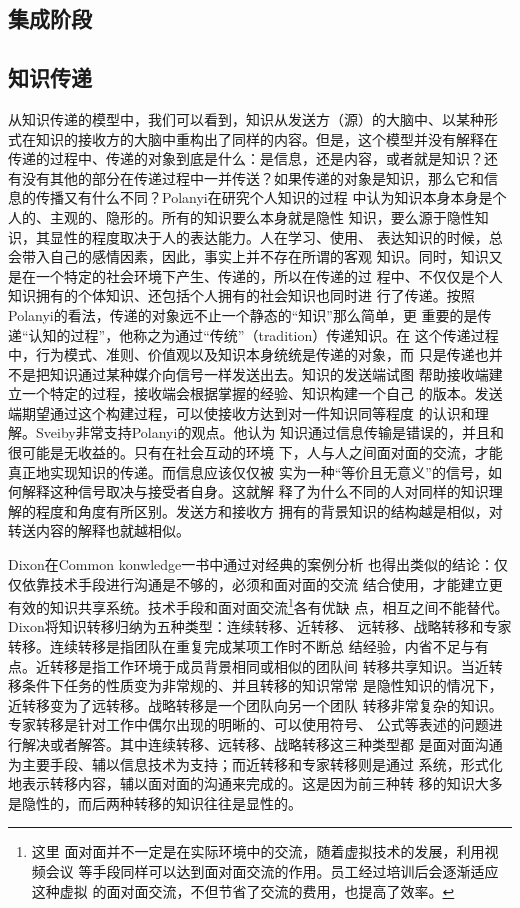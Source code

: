 \documentclass[12pt,a4paper]{ctexart}
\begin{document}
\subsection{集成阶段}




\subsection{知识传递}
从知识传递的模型中，我们可以看到，知识从发送方（源）的大脑中、以某种形
式在知识的接收方的大脑中重构出了同样的内容。但是，这个模型并没有解释在
传递的过程中、传递的对象到底是什么：是信息，还是内容，或者就是知识？还
有没有其他的部分在传递过程中一并传送？如果传递的对象是知识，那么它和信
息的传播又有什么不同？Polanyi\cite{polanyi1998pkt}在研究个人知识的过程
中认为知识本身本身是个人的、主观的、隐形的。所有的知识要么本身就是隐性
知识，要么源于隐性知识，其显性的程度取决于人的表达能力。人在学习、使用、
表达知识的时候，总会带入自己的感情因素，因此，事实上并不存在所谓的客观
知识。同时，知识又是在一个特定的社会环境下产生、传递的，所以在传递的过
程中、不仅仅是个人知识拥有的个体知识、还包括个人拥有的社会知识也同时进
行了传递。按照Polanyi的看法，传递的对象远不止一个静态的“知识”那么简单，更
重要的是传递“认知的过程”，他称之为通过“传统”（tradition）传递知识。在
这个传递过程中，行为模式、准则、价值观以及知识本身统统是传递的对象，而
只是传递也并不是把知识通过某种媒介向信号一样发送出去。知识的发送端试图
帮助接收端建立一个特定的过程，接收端会根据掌握的经验、知识构建一个自己
的版本。发送端期望通过这个构建过程，可以使接收方达到对一件知识同等程度
的认识和理解。Sveiby\cite{sveiby1996tka}非常支持Polanyi的观点。他认为
知识通过信息传输是错误的，并且和很可能是无收益的。只有在社会互动的环境
下，人与人之间面对面的交流，才能真正地实现知识的传递。而信息应该仅仅被
实为一种“等价且无意义”的信号，如何解释这种信号取决与接受者自身。这就解
释了为什么不同的人对同样的知识理解的程度和角度有所区别。发送方和接收方
拥有的背景知识的结构越是相似，对转送内容的解释也就越相似。

Dixon\cite{dixon2000ckc}在Common konwledge一书中通过对经典的案例分析
也得出类似的结论：仅仅依靠技术手段进行沟通是不够的，必须和面对面的交流
结合使用，才能建立更有效的知识共享系统。技术手段和面对面交流\footnote{这里
  面对面并不一定是在实际环境中的交流，随着虚拟技术的发展，利用视频会议
  等手段同样可以达到面对面交流的作用。员工经过培训后会逐渐适应这种虚拟
  的面对面交流，不但节省了交流的费用，也提高了效率。}各有优缺
点，相互之间不能替代。Dixon将知识转移归纳为五种类型：连续转移、近转移、
远转移、战略转移和专家转移。连续转移是指团队在重复完成某项工作时不断总
结经验，内省不足与有点。近转移是指工作环境于成员背景相同或相似的团队间
转移共享知识。当近转移条件下任务的性质变为非常规的、并且转移的知识常常
是隐性知识的情况下，近转移变为了远转移。战略转移是一个团队向另一个团队
转移非常复杂的知识。专家转移是针对工作中偶尔出现的明晰的、可以使用符号、
公式等表述的问题进行解决或者解答。其中连续转移、远转移、战略转移这三种类型都
是面对面沟通为主要手段、辅以信息技术为支持；而近转移和专家转移则是通过
系统，形式化地表示转移内容，辅以面对面的沟通来完成的。这是因为前三种转
移的知识大多是隐性的，而后两种转移的知识往往是显性的。
\end{document}
